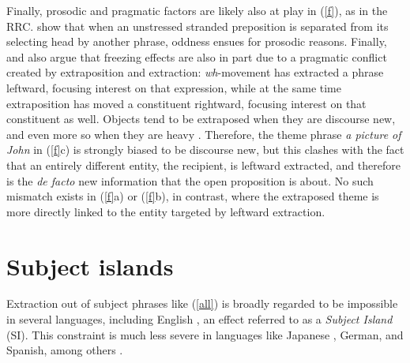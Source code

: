 \documentclass[output=paper
                ,modfonts
                ,nonflat
	        ,collection
	        ,collectionchapter
	        ,collectiontoclongg
 	        ,biblatex
                ,babelshorthands
                ,newtxmath
                ,draftmode
                ,colorlinks, citecolor=brown
]{./langsci/langscibook}
\begin{document}
 Finally, prosodic and pragmatic factors are likely also at  play in (\ref{f}), as in the RRC. \citet{huck} show that when an unstressed stranded preposition  is separated from its selecting head by another phrase, oddness ensues for prosodic reasons.  Finally,  \citet{huck} and  \citet{boling92} also
 argue that freezing effects are also in part due to a pragmatic conflict created by extraposition and extraction: \emph{wh}-movement has extracted a phrase leftward, focusing interest on that expression, while at the same time extraposition has moved a constituent rightward,  focusing interest on that constituent as well.  
Objects tend to be extraposed when they are discourse new, and even more so when they are heavy \citep[71]{wasowbook}. Therefore, the theme phrase \emph{a picture of John} in (\ref{f}c) is strongly biased to be discourse new,  but this clashes with the fact that an entirely different entity, the recipient, is leftward extracted, and therefore is the \emph{de facto} new information that the open proposition is about.  No such mismatch exists in (\ref{f}a) or (\ref{f}b), in contrast, where the extraposed theme is more directly linked to the  entity targeted by leftward extraction.


\section{Subject islands}

Extraction out of subject phrases like (\ref{all}) 
is broadly regarded to be impossible in several languages, including
English \citep{Ross67,chomsky73}, an effect referred to as a \emph{Subject Island} (SI).
This constraint is  much less severe  in languages like Japanese , German, and Spanish,
among others \citep{stepanov,jurkaetal,goodall11,greco,fukuda,polinsky13}. 


\eal \label{all}




\zl
\end{document}
